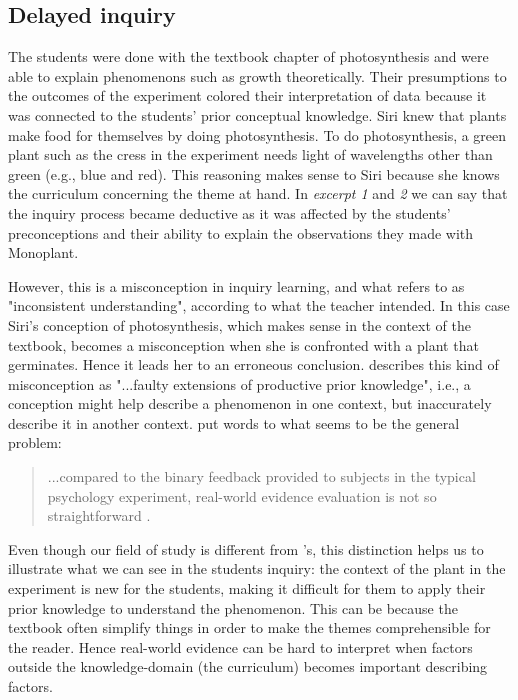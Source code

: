 \subsection{Delayed inquiry}
The students were done with the textbook chapter of photosynthesis and were able to explain phenomenons such as growth theoretically. Their presumptions to the outcomes of the experiment colored their interpretation of data because it was connected to the students' prior conceptual knowledge. Siri knew that plants make food for themselves by doing photosynthesis. To do photosynthesis, a green plant such as the cress in the experiment needs light of wavelengths other than green (e.g., blue and red). This reasoning makes sense to Siri because she knows the curriculum concerning the theme at hand. In \emph{excerpt 1} and \emph{2} we can say that the inquiry process became deductive as it was affected by the students' preconceptions and their ability to explain the observations they made with Monoplant.

However, this is a misconception in inquiry learning, and what \citet{gomez2008elementary} refers to as "inconsistent understanding", according to what the teacher intended. In this case Siri's conception of photosynthesis, which makes sense in the context of the textbook, becomes a misconception when she is confronted with a plant that germinates. Hence it leads her to an erroneous conclusion. \citet{smith1994misconceptions} describes this kind of misconception as "...faulty extensions of productive prior knowledge", i.e., a conception might help describe a phenomenon in one context, but inaccurately describe it in another context. \citeauthor*{klahr1993heuristics} put words to what seems to be the general problem: 

\begin{quote}...compared to the binary feedback provided to subjects in the typical psychology experiment, real-world evidence evaluation is not so straightforward \citetext{\citealp{klahr1993heuristics}, referenced in \citealp{de1998scientific}}.
\end{quote}

Even though our field of study is different from \citeauthor{klahr1993heuristics}'s, this distinction helps us to illustrate what we can see in the students inquiry: the context of the plant in the experiment is new for the students, making it difficult for them to apply their prior knowledge to understand the phenomenon. This can be because the textbook often simplify things in order to make the themes comprehensible for the reader. Hence real-world evidence can be hard to interpret when factors outside the knowledge-domain (the curriculum) becomes important describing factors.

